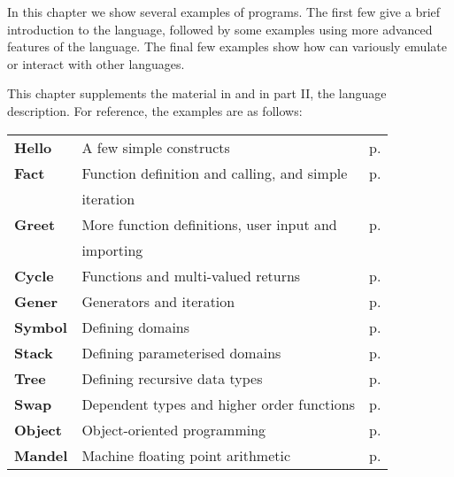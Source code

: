 In this chapter we show several examples of \asharp{} programs.
The first few give a brief introduction to the language, followed by some
examples using more advanced features of the language. The final
few examples show how \asharp{} can variously emulate or interact with
other languages.

This chapter supplements the material in  and
in part II, the language description.
For reference, the examples are as follows:

\begin{tabular}{@{}llr@{}}
{\bf Hello} & A few simple constructs
            & p. \pageref{helloWorldSample} \\
{\bf Fact}  & Function definition and calling, and simple 
            & p. \pageref{factorialSample} \\
            & iteration & \\
{\bf Greet} & More function definitions, user input and 
            & p. \pageref{greetSample} \\
            & importing & \\
{\bf Cycle} & Functions and multi-valued returns
            & p. \pageref{cycleSample} \\
{\bf Gener} & Generators and iteration
            & p. \pageref{generSample} \\
{\bf Symbol} & Defining domains
            & p. \pageref{symbolSample} \\
{\bf Stack} & Defining parameterised domains
            & p. \pageref{stackSample} \\
{\bf Tree} & Defining recursive data types
           & p. \pageref{recurseSample} \\
{\bf Swap} & Dependent types and higher order functions
           & p. \pageref{swapSample} \\
{\bf Object} & Object-oriented programming
             & p. \pageref{objectSample} \\
{\bf Mandel} & Machine floating point arithmetic
             & p. \pageref{mandelSample} \\

\end{tabular}
